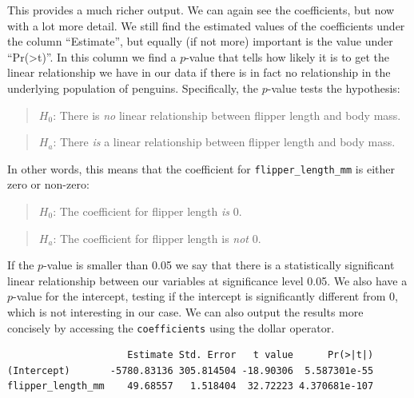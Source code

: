 \documentclass[
  letterpaper,
  DIV=11,
  numbers=noendperiod]{scrreprt}
\newenvironment{Shaded}{\begin{snugshade}}{\end{snugshade}}
\newcommand{\NormalTok}[1]{\textcolor[rgb]{0.00,0.23,0.31}{#1}}
\newcommand{\SpecialCharTok}[1]{\textcolor[rgb]{0.37,0.37,0.37}{#1}}
\begin{document}
This provides a much richer output. We can again see the coefficients,
but now with a lot more detail. We still find the estimated values of
the coefficients under the column ``Estimate'', but equally (if not
more) important is the value under
``Pr(\textgreater\textbar t\textbar)''. In this column we find a
\(p\)-value that tells how likely it is to get the linear relationship
we have in our data if there is in fact no relationship in the
underlying population of penguins. Specifically, the \(p\)-value tests
the hypothesis:

\begin{quote}
\textbf{\(H_0\)}: There is \emph{no} linear relationship between flipper
length and body mass.
\end{quote}

\begin{quote}
\textbf{\(H_a\)}: There \emph{is} a linear relationship between flipper
length and body mass.
\end{quote}

In other words, this means that the coefficient for
\texttt{flipper\_length\_mm} is either zero or non-zero:

\begin{quote}
\textbf{\(H_0\)}: The coefficient for flipper length \emph{is} 0.
\end{quote}

\begin{quote}
\textbf{\(H_a\)}: The coefficient for flipper length is \emph{not} 0.
\end{quote}

If the \(p\)-value is smaller than 0.05 we say that there is a
statistically significant linear relationship between our variables at
significance level 0.05. We also have a \(p\)-value for the intercept,
testing if the intercept is significantly different from 0, which is not
interesting in our case. We can also output the results more concisely
by accessing the \texttt{coefficients} using the dollar operator.

\begin{Shaded}
\end{Shaded}

\begin{verbatim}
                     Estimate Std. Error   t value      Pr(>|t|)
(Intercept)       -5780.83136 305.814504 -18.90306  5.587301e-55
flipper_length_mm    49.68557   1.518404  32.72223 4.370681e-107
\end{verbatim}
\end{document}
